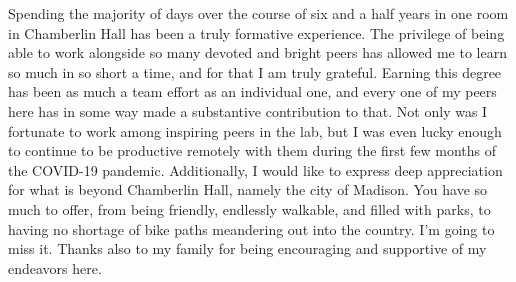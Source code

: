 



Spending the majority of days over the course of six and a half years in one room in Chamberlin Hall has been a truly formative experience. The privilege of being able to work alongside so many devoted and bright peers has allowed me to learn so much in so short a time, and for that I am truly grateful. Earning this degree has been as much a team effort as an individual one, and every one of my peers here has in some way made a substantive contribution to that. Not only was I fortunate to work among inspiring peers in the lab, but I was even lucky enough to continue to be productive remotely with them during the first few months of the COVID-19 pandemic. Additionally, I would like to express deep appreciation for what is beyond Chamberlin Hall, namely the city of Madison. You have so much to offer, from being friendly, endlessly walkable, and filled with parks, to having no shortage of bike paths meandering out into the country. I'm going to miss it. Thanks also to my family for being encouraging and supportive of my endeavors here.


